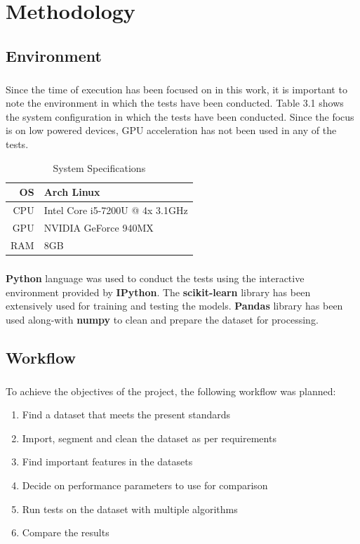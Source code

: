 \chapter{Methodology}
\label{ch:PD}

\section{Environment}

\paragraph{}
Since the time of execution has been focused on in this work, it is important to note the environment in which the tests have been conducted. Table 3.1 shows the system configuration in which the tests have been conducted. Since the focus is on low powered devices, GPU acceleration has not been used in any of the tests.
\begin{table}[h]
    \centering
    \caption{System Specifications}
    \begin{tabular}{| r | l |}
        \hline
        OS & Arch Linux \\
        \hline
        CPU & Intel Core i5-7200U @ 4x 3.1GHz \\
        \hline
        GPU & NVIDIA GeForce 940MX \\
        \hline
        RAM & 8GB \\
        \hline
    \end{tabular}
\end{table}

\paragraph{}
\textbf{Python} language was used to conduct the tests using the interactive environment provided by \textbf{IPython}. The \textbf{scikit-learn} library has been extensively used for training and testing the models. \textbf{Pandas} library has been used along-with \textbf{numpy} to clean and prepare the dataset for processing.

\section{Workflow}
\paragraph{}
To achieve the objectives of the project, the following workflow was planned:
\begin{enumerate}
    \item Find a dataset that meets the present standards
    \item Import, segment and clean the dataset as per requirements
    \item Find important features in the datasets
    \item Decide on performance parameters to use for comparison
    \item Run tests on the dataset with multiple algorithms
    \item Compare the results
\end{enumerate}

